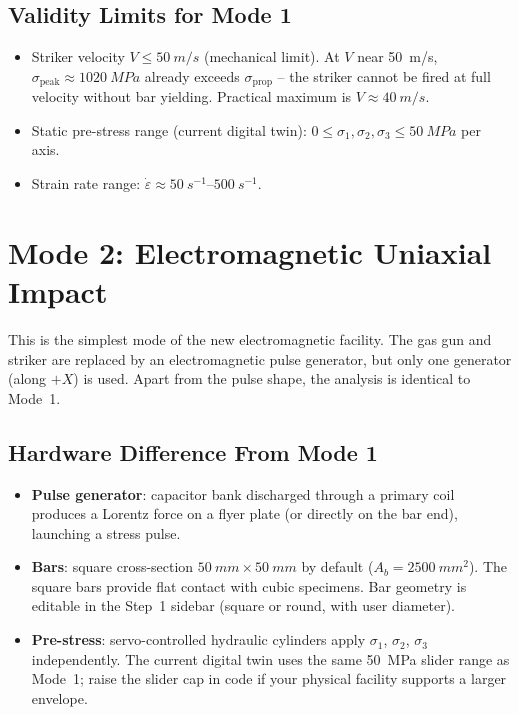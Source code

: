 \documentclass[11pt,a4paper]{article}
\providecommand{\SI}[2]{\qty{#1}{#2}}
\providecommand{\SIrange}[3]{\qtyrange{#1}{#2}{#3}}
\newcommand{\sig}{\sigma}
\newcommand{\eps}{\varepsilon}
\newcommand{\epsdot}{\dot\eps}
\newcommand{\Ab}{A_b}
\newcommand{\sigprop}{\sig_{\text{prop}}}
\newcommand{\sigpeak}{\sig_{\text{peak}}}
\begin{document}
\subsection{Validity Limits for Mode 1}

\begin{itemize}[leftmargin=*]
  \item Striker velocity $V \leq \SI{50}{m/s}$ (mechanical limit). At $V$ near
        \SI{50}{m/s}, $\sigpeak \approx \SI{1020}{MPa}$ already exceeds
        $\sigprop$ -- the striker cannot be fired at full velocity without
        bar yielding. Practical maximum is $V \approx \SI{40}{m/s}$.
  \item Static pre-stress range (current digital twin):
        $0 \leq \sig_1, \sig_2, \sig_3 \leq \SI{50}{MPa}$ per axis.
  \item Strain rate range: $\epsdot \approx \SIrange{50}{500}{s^{-1}}$.
\end{itemize}

\newpage
\section{Mode 2: Electromagnetic Uniaxial Impact}

This is the simplest mode of the new electromagnetic facility. The gas gun and
striker are replaced by an electromagnetic pulse generator, but only one
generator (along $+X$) is used. Apart from the pulse shape, the analysis is
identical to Mode~1.

\subsection{Hardware Difference From Mode 1}

\begin{itemize}[leftmargin=*]
  \item \textbf{Pulse generator}: capacitor bank discharged through a primary
        coil produces a Lorentz force on a flyer plate (or directly on the bar
        end), launching a stress pulse.
  \item \textbf{Bars}: square cross-section $\SI{50}{mm} \times \SI{50}{mm}$
        by default ($\Ab = \SI{2500}{mm^2}$). The square bars provide flat
        contact with cubic specimens. Bar geometry is editable in the Step~1
        sidebar (square or round, with user diameter).
  \item \textbf{Pre-stress}: servo-controlled hydraulic cylinders apply
        $\sig_1$, $\sig_2$, $\sig_3$ independently. The current digital twin
        uses the same \SI{50}{MPa} slider range as Mode~1; raise the slider
        cap in code if your physical facility supports a larger envelope.
\end{itemize}
\end{document}
